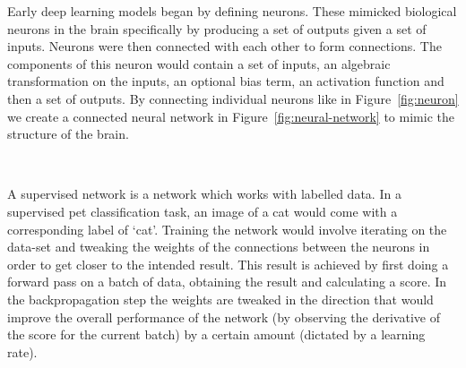 \documentclass[11pt,twoside]{report}
\begin{document}
Early deep learning models began by defining neurons. These mimicked biological neurons in the brain specifically by producing a set of outputs given a set of inputs. Neurons were then connected with each other to form connections. The components of this neuron would contain a set of inputs, an algebraic transformation on the inputs, an optional bias term, an activation function and then a set of outputs. By connecting individual neurons like in Figure~\ref{fig:neuron} we create a connected neural network in Figure~\ref{fig:neural-network} to mimic the structure of the brain.

\begin{figure}
  \centering
  ~
  \caption{}
\end{figure}

A supervised network is a network which works with labelled data. In a supervised pet classification task, an image of a cat would come with a corresponding label of `cat'. Training the network would involve iterating on the data-set and tweaking the weights of the connections between the neurons in order to get closer to the intended result. This result is achieved by first doing a forward pass on a batch of data, obtaining the result and calculating a score. In the backpropagation step the weights are tweaked in the direction that would improve the overall performance of the network (by observing the derivative of the score for the current batch) by a certain amount (dictated by a learning rate).
\end{document}
